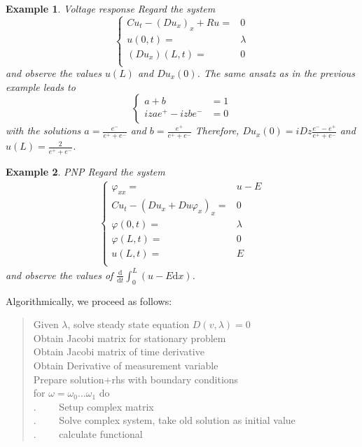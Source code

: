 \documentclass[12pt]{amsproc}
\newtheorem{example}{Example}
\begin{document}
\begin{example}{Voltage response}
Regard the system
  \begin{equation*}
    \begin{cases}
      Cu_t - (Du_x)_x + Ru=&0\\
      u(0,t)=&\lambda\\
      (Du_x)(L,t)=&0\\
    \end{cases}
  \end{equation*}
  and observe the values $u(L)$ and $Du_x(0)$.
The same ansatz as in the previous example leads to 
\begin{equation*}
  \begin{cases}
    a+b&=1\\
    izae^+-izbe^-&=0\\
  \end{cases}
\end{equation*}
with the solutions $a=\frac{e^-}{e^++e^-}$ and $b=\frac{e^+}{e^++e^-}$
Therefore,  $Du_x(0)=iDz\frac{e^--e^+}{e^++e^-}$ and
$u(L)=\frac2{e^++e^-}$.
\end{example}

\begin{example}{PNP}
Regard the system
  \begin{align*}
    \begin{cases}
      \varphi_{xx} =& u - E\\
      Cu_t - (Du_x + Du\varphi_x)_x =&0\\
      \varphi(0,t)=&\lambda\\
      \varphi(L,t)=&0\\
      u(L,t)=&E\\
    \end{cases}
  \end{align*}
  and observe the values of $\frac{\mathrm{d}}{\mathrm{d}t} \int_0^L( u - E \mathrm{d}x)$.
\end{example}


Algorithmically, we proceed as follows:
\begin{quotation}
\parindent0pt
Given $\lambda$, solve steady state equation $D(v,\lambda)=0$\\
Obtain Jacobi matrix for stationary problem \\%
Obtain Jacobi matrix of time derivative\\ %
Obtain Derivative of measurement variable\\ %

Prepare solution+rhs with boundary conditions\\
for $\omega=\omega_0\dots\omega_1$ do\\
.~~~~ Setup complex matrix\\
.~~~~ Solve complex system, take old solution as initial value\\
.~~~~ calculate functional\\
\end{quotation}
\end{document}
